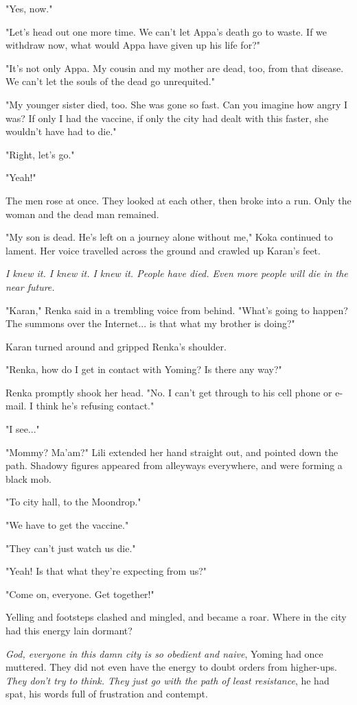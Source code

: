 "Yes, now."

"Let's head out one more time. We can't let Appa's death go to waste. If
we withdraw now, what would Appa have given up his life for?"

"It's not only Appa. My cousin and my mother are dead, too, from that
disease. We can't let the souls of the dead go unrequited."

"My younger sister died, too. She was gone so fast. Can you imagine how
angry I was? If only I had the vaccine, if only the city had dealt with
this faster, she wouldn't have had to die."

"Right, let's go."

"Yeah!"

The men rose at once. They looked at each other, then broke into a run.
Only the woman and the dead man remained.

"My son is dead. He's left on a journey alone without me," Koka
continued to lament. Her voice travelled across the ground and crawled
up Karan's feet.

\emph{I knew it. I knew it. I knew it. People have died. Even more people will
	die in the near future.}

"Karan," Renka said in a trembling voice from behind. "What's going to
happen? The summons over the Internet... is that what my brother is
doing?"

Karan turned around and gripped Renka's shoulder.

"Renka, how do I get in contact with Yoming? Is there any way?"

Renka promptly shook her head. "No. I can't get through to his cell
phone or e-mail. I think he's refusing contact."

"I see..."

"Mommy? Ma'am?" Lili extended her hand straight out, and pointed down
the path. Shadowy figures appeared from alleyways everywhere, and were
forming a black mob.

"To city hall, to the Moondrop."

"We have to get the vaccine."

"They can't just watch us die."

"Yeah! Is that what they're expecting from us?"

"Come on, everyone. Get together!"

Yelling and footsteps clashed and mingled, and became a roar. Where in
the city had this energy lain dormant?

\emph{God, everyone in this damn city is so obedient and naive}, Yoming had
once muttered. They did not even have the energy to doubt orders from
higher-ups. \emph{They don't try to think. They just go with the path of least
	resistance}, he had spat, his words full of frustration and contempt.

